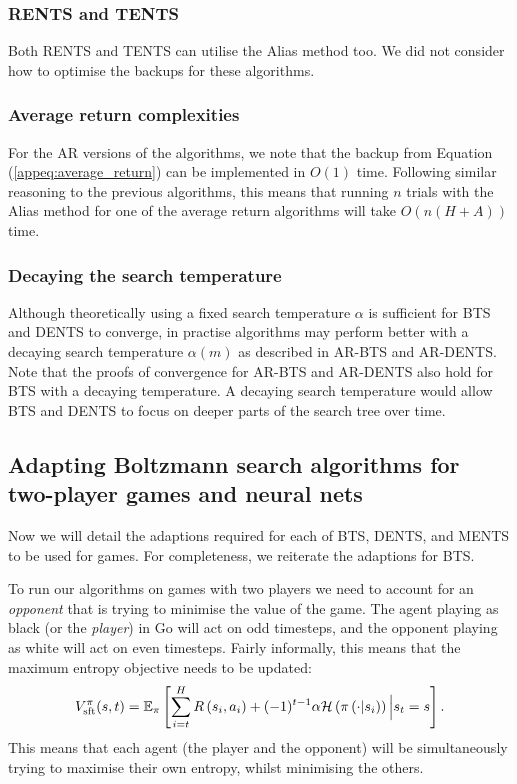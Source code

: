 \documentclass{article}
\newcommand{\bb}[1]{\mathbb{#1}}
\newcommand{\Vsp}[2]{V^{#2}_{\textnormal{sft}}(#1)}
\theoremstyle{plain}
\begin{document}
\begin{appendices}
        \subsubsection{RENTS and TENTS}
        
       		Both RENTS and TENTS can utilise the Alias method too. We did not consider how to optimise the backups for these algorithms.
            
%	    	
	    	\subsubsection{Average return complexities}
	    		For the AR versions of the algorithms, we note that the backup from Equation (\ref{appeq:average_return}) can be implemented in $O(1)$ time. Following similar reasoning to the previous algorithms, this means that running $n$ trials with the Alias method for one of the average return algorithms will take $O(n(H+A))$ time.
	    		
	    	
	    	\subsubsection{Decaying the search temperature}
	    		Although theoretically using a fixed search temperature $\alpha$ is sufficient for BTS and DENTS to converge, in practise algorithms may perform better with a decaying search temperature $\alpha(m)$ as described in AR-BTS and AR-DENTS. Note that the proofs of convergence for AR-BTS and AR-DENTS also hold for BTS with a decaying temperature. A decaying search temperature would allow BTS and DENTS to focus on deeper parts of the search tree over time.
	
	
	
	\subsection{Adapting Boltzmann search algorithms for two-player games and neural nets} \label{app:adapt_for_games} \label{app:adapt_for_nets}
            Now we will detail the adaptions required for each of BTS, DENTS, and MENTS to be used for games. For completeness, we reiterate the adaptions for BTS.
            
            To run our algorithms on games with two players we need to account for an \textit{opponent} that is trying to minimise the value of the game. The agent playing as black (or the \textit{player}) in Go will act on odd timesteps, and the opponent playing as white will act on even timesteps. Fairly informally, this means that the maximum entropy objective needs to be updated:
        \begin{align}
            \Vsp{s,t}{\pi} = \bb{E}_{\pi} \left[\sum_{i=t}^{H} R\left(s_{i}, a_{i}\right)+ (-1)^{t-1}\alpha \mathcal{H}\left(\pi\left(\cdot|s_{i}\right)\right) \Big\vert s_t=s\right]. \label{appeq:altered_max_ent_objective}
        \end{align}
        This means that each agent (the player and the opponent) will be simultaneously trying to maximise their own entropy, whilst minimising the others.
            

\end{appendices}
\end{document}
